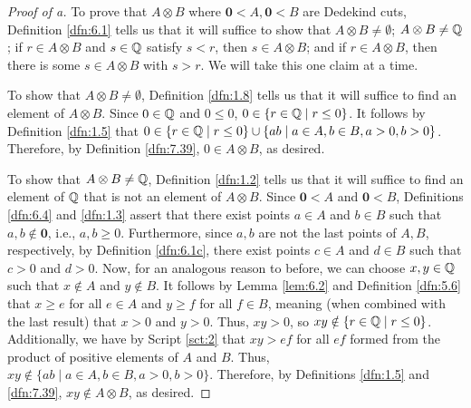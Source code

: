 \documentclass[../main.tex]{subfiles}
\begin{document}
\begin{exercise}
\begin{proof}[Proof of a]
        To prove that $A\otimes B$ where $\bm{0}<A,\bm{0}<B$ are Dedekind cuts, Definition \ref{dfn:6.1} tells us that it will suffice to show that $A\otimes B\neq\emptyset$; $A\otimes B\neq\mathbb{Q}$; if $r\in A\otimes B$ and $s\in\mathbb{Q}$ satisfy $s<r$, then $s\in A\otimes B$; and if $r\in A\otimes B$, then there is some $s\in A\otimes B$ with $s>r$. We will take this one claim at a time.\par
        To show that $A\otimes B\neq\emptyset$, Definition \ref{dfn:1.8} tells us that it will suffice to find an element of $A\otimes B$. Since $0\in\mathbb{Q}$ and $0\leq 0$, $0\in\{r\in\mathbb{Q}\mid r\leq 0\}$. It follows by Definition \ref{dfn:1.5} that $0\in\{r\in\mathbb{Q}\mid r\leq 0\}\cup\{ab\mid a\in A,b\in B,a>0,b>0\}$. Therefore, by Definition \ref{dfn:7.39}, $0\in A\otimes B$, as desired.\par
        To show that $A\otimes B\neq\mathbb{Q}$, Definition \ref{dfn:1.2} tells us that it will suffice to find an element of $\mathbb{Q}$ that is not an element of $A\otimes B$. Since $\bm{0}<A$ and $\bm{0}<B$, Definitions \ref{dfn:6.4} and \ref{dfn:1.3} assert that there exist points $a\in A$ and $b\in B$ such that $a,b\notin\bm{0}$, i.e., $a,b\geq 0$. Furthermore, since $a,b$ are not the last points of $A,B$, respectively, by Definition \ref{dfn:6.1c}, there exist points $c\in A$ and $d\in B$ such that $c>0$ and $d>0$. Now, for an analogous reason to before, we can choose $x,y\in\mathbb{Q}$ such that $x\notin A$ and $y\notin B$. It follows by Lemma \ref{lem:6.2} and Definition \ref{dfn:5.6} that $x\geq e$ for all $e\in A$ and $y\geq f$ for all $f\in B$, meaning (when combined with the last result) that $x>0$ and $y>0$. Thus, $xy>0$, so $xy\notin\{r\in\mathbb{Q}\mid r\leq 0\}$. Additionally, we have by Script \ref{sct:2} that $xy>ef$ for all $ef$ formed from the product of positive elements of $A$ and $B$. Thus, $xy\notin\{ab\mid a\in A,b\in B,a>0,b>0\}$. Therefore, by Definitions \ref{dfn:1.5} and \ref{dfn:7.39}, $xy\notin A\otimes B$, as desired.\par

\end{proof}
\end{exercise}
\end{document}
